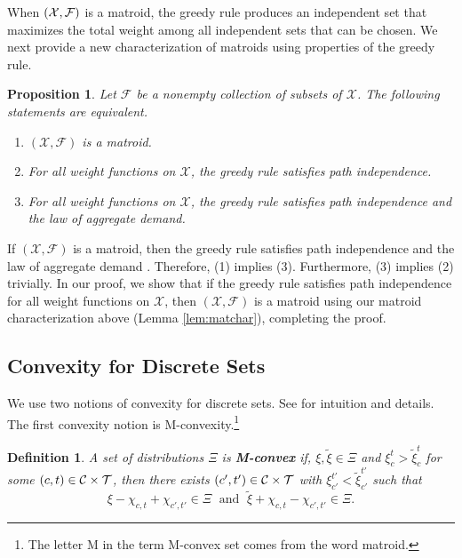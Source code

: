 \documentclass[12pt]{amsart}
\newtheorem{definition}{Definition}
\newtheorem{proposition}{Proposition}
\theoremstyle{remark}
\begin{document}
When $(\mathcal{X},\mathcal{F})$ is a matroid, the greedy rule produces an independent set
that maximizes the total weight among all independent sets that can be
chosen. We next provide a new
characterization of matroids using properties of the greedy rule.

\begin{proposition}\label{prop:matroid}
Let $\mathcal{F}$ be a nonempty collection of subsets of $\mathcal{X}$. The following statements are equivalent.
\begin{enumerate}
\item $(\mathcal{X},\mathcal{F})$ is a matroid.
\item For all weight functions on $\mathcal{X}$, the greedy rule satisfies path independence.
\item For all weight functions on $\mathcal{X}$, the greedy rule satisfies path independence and the law of aggregate demand.
\end{enumerate}
\end{proposition}

If $(\mathcal{X},\mathcal{F})$ is a matroid, then the greedy rule satisfies
path independence \citep{fleiner2001} and the law of aggregate
demand \citep{yokoi2019}. Therefore, (1) implies (3). Furthermore, (3) implies
(2) trivially. In our proof, we show that if the greedy rule satisfies
path independence for all weight functions on $\mathcal{X}$, then
$(\mathcal{X},\mathcal{F})$ is a matroid using our matroid characterization
above (Lemma \ref{lem:matchar}), completing the proof.

\subsection{Convexity for Discrete Sets}\label{sec:convexity}
We use two notions of convexity for discrete sets. See \cite{Murota:SIAM:2003} for intuition and details. The first convexity notion is
M-convexity.\footnote{The letter M in the term M-convex set comes from the
word matroid.}

\begin{definition}
A set of distributions $\Xi$ is \textbf{M-convex} if, $\xi,\tilde{\xi} \in \Xi$ and $\xi_c^t>\tilde{\xi}_c^t$ for some $(c,t) \in \mathcal{C} \times \mathcal{T}$,
then there exists $(c',t') \in \mathcal{C} \times \mathcal{T}$ with $\xi_{c'}^{t'}<\tilde{\xi}_{c'}^{t'}$ such that
\[\xi-\chi_{c,t}+\chi_{c',t'}\in \Xi \; \mbox{ and } \; \tilde{\xi}+\chi_{c,t}-\chi_{c',t'} \in \Xi.\]
\end{definition}
\end{document}
